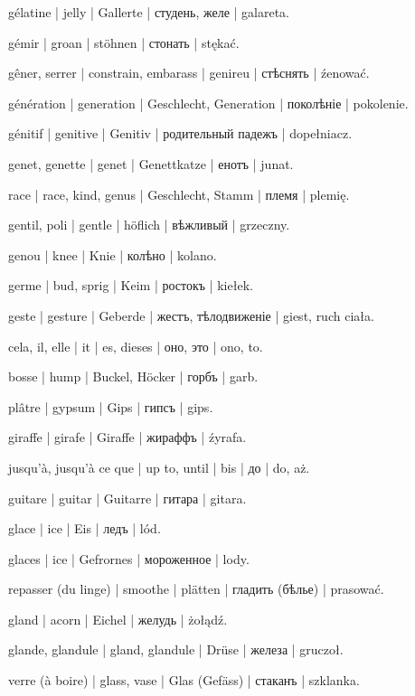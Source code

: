 \begin{outdent}{1em}
gélatine | jelly | Gallerte | студень, желе | galareta.

gémir | groan | stöhnen | стонать | stękać.

gêner, serrer | constrain, embarass | genireu | стѣснять | źenować.

génération | generation | Geschlecht, Generation | поколѣніе | pokolenie.

génitif | genitive | Genitiv | родительный падежъ | dopełniacz.

genet, genette | genet | Genettkatze | енотъ | junat.

race | race, kind, genus | Geschlecht, Stamm | племя | plemię.

gentil, poli | gentle | höflich | вѣжливый | grzeczny.

genou | knee | Knie | колѣно | kolano.

germe | bud, sprig | Keim | ростокъ | kiełek.

geste | gesture | Geberde | жестъ, тѣлодвиженіе | giest, ruch
ciała.

cela, il, elle | it | es, dieses | оно, это | ono, to.

bosse | hump | Buckel, Höcker | горбъ | garb.

plâtre | gypsum | Gips | гипсъ | gips.

giraffe | girafe | Giraffe | жираффъ | źyrafa.

jusqu’à, jusqu’à ce que | up to, until | bis | до | do, aż.

guitare | guitar | Guitarre | гитара | gitara.

glace | ice | Eis | ледъ | lód.

\uvsubentry{}
glaces | ice | Gefrornes | мороженное | lody.

repasser (du linge) | smoothe | plätten | гладить (бѣлье) | prasować.

gland | acorn | Eichel | желудь | żołądź.

glande, glandule | gland, glandule | Drüse | железа | gruczoł.

verre (à boire) | glass, vase | Glas (Gefäss) | стаканъ | szklanka.


\end{outdent}
